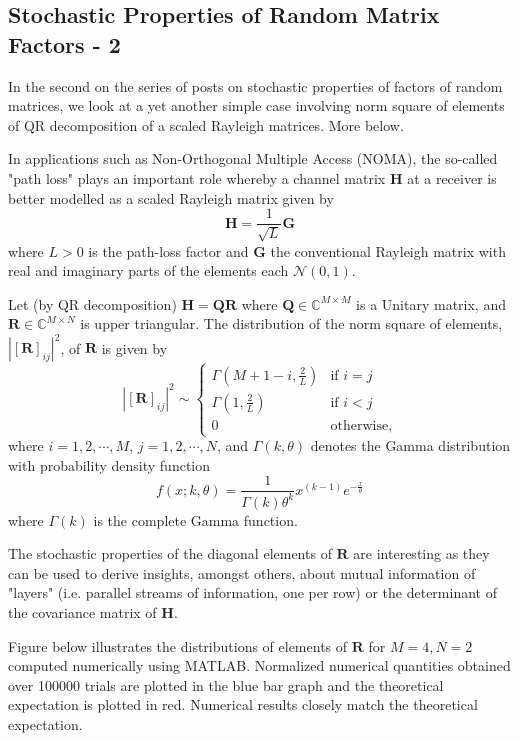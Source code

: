 \subsection{Stochastic Properties of Random Matrix Factors - 2}

In the second on the series of posts on stochastic properties of factors of random matrices, we look at a yet another simple case involving norm square of elements of QR decomposition of a scaled Rayleigh matrices. More below.

In applications such as Non-Orthogonal Multiple Access (NOMA), the so-called "path loss" plays an important role whereby a channel matrix $\mathbf{H}$ at a receiver is better modelled as a scaled Rayleigh matrix given by $$\mathbf{H} = \frac{1}{\sqrt{L}} \mathbf{G}$$ where $L > 0$ is the path-loss factor and $\mathbf{G}$ the conventional Rayleigh matrix with real and imaginary parts of the elements each $\mathcal{N}(0,1)$.

Let (by QR decomposition) $\mathbf{H} = \mathbf{Q}\mathbf{R}$ where $\mathbf{Q} \in \mathbb{C}^{M\times M}$ is a Unitary matrix, and $\mathbf{R} \in \mathbb{C}^{M\times N}$ is upper triangular. The distribution of the norm square of elements, $|[\mathbf{R}]_{ij}|^2$, of $\mathbf{R}$ is given by $$|[\mathbf{R}]_{ij}|^2 \sim \begin{cases} \Gamma(M+1-i,\frac{2}{L}) & \text{if $i = j$} \\ \Gamma(1,\frac{2}{L}) & \text{if $i < j$} \\ 0 & \text{otherwise,} \end{cases}$$ where $i=1,2,\cdots,M$, $j=1,2,\cdots,N$, and $\Gamma(k,\theta)$ denotes the Gamma distribution with probability density function $$f(x; k,\theta) = \frac{1}{\Gamma(k)\theta^k}x^{(k-1)}e^{-\frac{x}{\theta}}$$ where $\Gamma(k)$ is the complete Gamma function.

The stochastic properties of the diagonal elements of $\mathbf{R}$ are interesting as they can be used to derive insights, amongst others, about mutual information of "layers" (i.e. parallel streams of information, one per row) or the determinant of the covariance matrix of $\mathbf{H}$.

Figure below illustrates the distributions of elements of $\mathbf{R}$ for $M=4, N=2$ computed numerically using MATLAB. Normalized numerical quantities obtained over 100000 trials are plotted in the blue bar graph and the theoretical expectation is plotted in red. Numerical results closely match the theoretical expectation.

